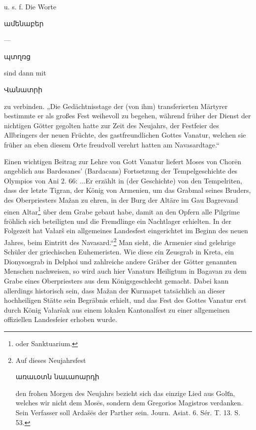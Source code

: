 \documentclass{article}
\begin{document}
u. s. f. Die Worte \begin{armenian}ամենաբեր\end{armenian} — \begin{armenian}պտղռց\end{armenian} sind dann mit \begin{armenian}Վանատրի\end{armenian} zu verbinden. „Die Gedächtnisstage der (von ihm) transferierten Märtyrer bestimmte er als großes Fest weihevoll zu begehen, während früher der Dienst der nichtigen Götter gegolten hatte zur Zeit des Neujahrs, der Festfeier des Allbringers der neuen Früchte, des gastfreundlichen Gottes Vanatur, welchen sie früher an eben diesem Orte freudvoll verehrt hatten am Navasardtage.“

Einen wichtigen Beitrag zur Lehre von Gott Vanatur liefert Moses von Chorēn angeblich aus Bardesanes' (Bardacans) Fortsetzung der Tempelgeschichte des Olympios von Ani 2. 66: ...Er erzählt in (der Geschichte) von den Tempelriten, dass der letzte Tigran, der König von Armenien, um das Grabmal seines Bruders, des Oberpriesters Mažan zu ehren, in der Burg der Altäre im Gau Bagrevand einen Altar\footnote{oder Sanktuarium.} über dem Grabe gebaut habe, damit an den Opfern alle Pilgrime fröhlich sich beteiligten und die Fremdlinge ein Nachtlager erhielten. In der Folgezeit hat Vałarš ein allgemeines Landesfest eingerichtet im Beginn des neuen Jahres, beim Eintritt des Navasard.“\footnote{Auf dieses Neujahrsfest \begin{armenian}առաւօտն նաւաոարդի\end{armenian} den frohen Morgen des Neujahrs bezieht sich das einzige Lied aus Gołt͑n, welches wir nicht dem Mosēs, sondern dem Gregorios Magistros verdanken. Sein Verfasser soll Ardašēs der Parther sein. Journ. Asiat. 6. Sér. T. 13. S. 53.} Man sieht, die Armenier sind gelehrige Schüler der griechischen Euhemeristen. Wie diese ein Zeusgrab in Kreta, ein Dionysosgrab in Delphoi und zahlreiche andere Gräber der Götter genannten Menschen nachweisen, so wird auch hier Vanaturs Heiligtum in Bagavan zu dem Grabe eines Oberpriesters aus dem Königsgeschlecht gemacht. Dabei kann allerdings historisch sein, dass Mažan der K͑urmapet tatsächlich an dieser hochheiligen Stätte sein Begräbnis erhielt, und das Fest des Gottes Vanatur erst durch König Vałaršak aus einem lokalen Kantonalfest zu einer allgemeinen offiziellen Landesfeier erhoben wurde.
\end{document}
